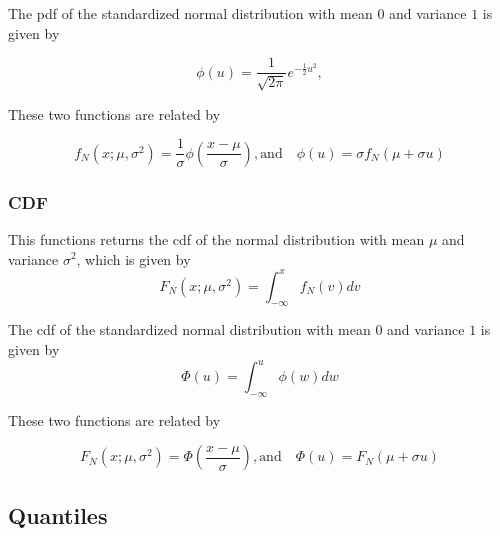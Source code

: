 The pdf of the standardized normal distribution with mean $0$ and variance $1$ is given by

\begin{equation} \label{eq:StandardNormal_pdf}
	\phi(u) = \frac{1}{\sqrt{2\pi}} e^{- \frac{1}{2} u^2}, 
\end{equation}

These two functions are related by

\begin{equation} 
	f_N(x; \mu, \sigma^2) =  \frac{1}{\sigma} \phi \left(\frac{x-\mu}{\sigma} \right), \text{and} \quad  \phi(u) = \sigma f_N(\mu + \sigma u)
\end{equation}


\subsubsection{CDF}
\label{sec:NormalDistribution_CDF}
%
This functions returns the cdf of the normal distribution with mean $\mu$ and variance $\sigma^2$, which is given by
\begin{equation}
	F_N(x; \mu, \sigma^2) = \int_{-\infty}^x f_N(v) dv
\end{equation}

The cdf of the standardized normal distribution with mean $0$ and variance $1$ is given by
\begin{equation}
	\Phi(u) = \int_{-\infty}^u \phi(w) dw
\end{equation}

These two functions are related by

\begin{equation} 
	F_N(x; \mu, \sigma^2) =  \Phi \left(\frac{x-\mu}{\sigma} \right), \text{and} \quad  \Phi(u) = F_N(\mu + \sigma u)
\end{equation}




\subsection{Quantiles}
\label{sec:NormalDistribution_Quantiles}

